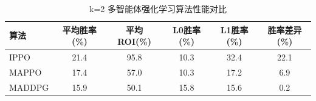 
\begin{table}[h]
\centering
\caption{k=2 多智能体强化学习算法性能对比}
\begin{tabular}{lccccc}
\hline
算法 & 平均胜率(\%) & 平均ROI(\%) & L0胜率(\%) & L1胜率(\%) & 胜率差异(\%) \\
\hline
IPPO & 21.4 & 95.8 & 10.3 & 32.4 & 22.1 \\
MAPPO & 17.4 & 57.0 & 10.3 & 17.2 & 6.9 \\
MADDPG & 15.9 & 50.1 & 15.8 & 15.6 & 0.2 \\
\hline
\end{tabular}
\label{tab:k2_comparison}
\end{table}
